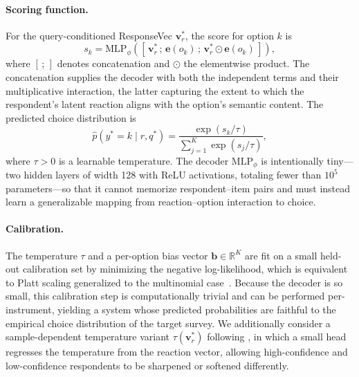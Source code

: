 \paragraph{Scoring function.} For the query-conditioned ResponseVec $\mathbf{v}^\ast_r$, the score for option $k$ is
\begin{equation}
\label{eq:score}
s_k = \mathrm{MLP}_\phi\!\left( \left[\, \mathbf{v}^\ast_r \,;\, \mathbf{e}(o_k) \,;\, \mathbf{v}^\ast_r \odot \mathbf{e}(o_k) \,\right] \right),
\end{equation}
where $[\,;\,]$ denotes concatenation and $\odot$ the elementwise product. The concatenation supplies the decoder with both the independent terms and their multiplicative interaction, the latter capturing the extent to which the respondent's latent reaction aligns with the option's semantic content. The predicted choice distribution is
\begin{equation}
\label{eq:softmax}
\hat{p}(y^\ast = k \mid r, q^\ast) = \frac{\exp(s_k / \tau)}{\sum_{j=1}^{K} \exp(s_j / \tau)},
\end{equation}
where $\tau > 0$ is a learnable temperature. The decoder $\mathrm{MLP}_\phi$ is intentionally tiny---two hidden layers of width 128 with ReLU activations, totaling fewer than $10^5$ parameters---so that it cannot memorize respondent--item pairs and must instead learn a generalizable mapping from reaction--option interaction to choice.

\paragraph{Calibration.} The temperature $\tau$ and a per-option bias vector $\mathbf{b} \in \mathbb{R}^K$ are fit on a small held-out calibration set by minimizing the negative log-likelihood, which is equivalent to Platt scaling generalized to the multinomial case~\citep{filho2023classifier}. Because the decoder is so small, this calibration step is computationally trivial and can be performed per-instrument, yielding a system whose predicted probabilities are faithful to the empirical choice distribution of the target survey. We additionally consider a sample-dependent temperature variant $\tau(\mathbf{v}^\ast_r)$ following \citet{joy2023sampledependent}, in which a small head regresses the temperature from the reaction vector, allowing high-confidence and low-confidence respondents to be sharpened or softened differently.

